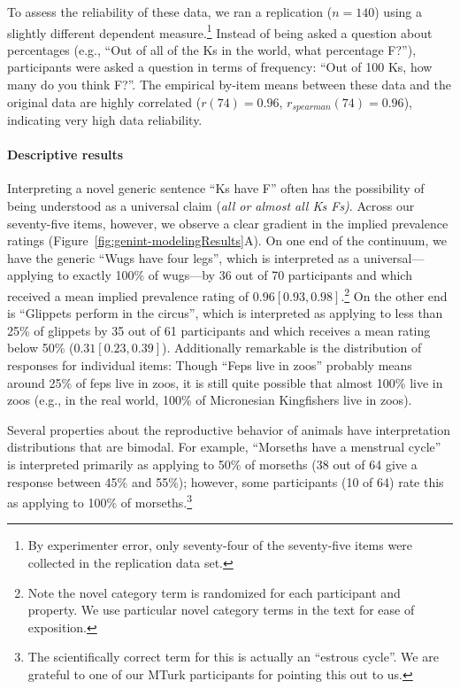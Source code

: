 \documentclass[floatsintext,doc]{apa6}
\theoremstyle{definition}
\theoremstyle{definition}
\theoremstyle{definition}
\theoremstyle{remark}
\begin{document}
To assess the reliability of these data, we ran a replication
(\(n=140\)) using a slightly different dependent measure.\footnote{By
  experimenter error, only seventy-four of the seventy-five items were
  collected in the replication data set.} Instead of being asked a
question about percentages (e.g., \enquote{Out of all of the Ks in the
world, what percentage F?}), participants were asked a question in terms
of frequency: \enquote{Out of 100 Ks, how many do you think F?}. The
empirical by-item means between these data and the original data are
highly correlated (\(r(74) = 0.96\), \(r_{spearman}(74)= 0.96\)),
indicating very high data reliability.

\paragraph{Descriptive results}\label{descriptive-results}

Interpreting a novel generic sentence \enquote{Ks have F} often has the
possibility of being understood as a universal claim (\emph{all or
almost all Ks Fs)}. Across our seventy-five items, however, we observe a
clear gradient in the implied prevalence ratings
(Figure~\ref{fig:genint-modelingResults}A). On one end of the continuum,
we have the generic \enquote{Wugs have four legs}, which is interpreted
as a universal---applying to exactly 100\% of wugs---by 36 out of 70
participants and which received a mean implied prevalence rating of
\(0.96 [0.93, 0.98]\).\footnote{Note the novel category term is
  randomized for each participant and property. We use particular novel
  category terms in the text for ease of exposition.} On the other end
is \enquote{Glippets perform in the circus}, which is interpreted as
applying to less than 25\% of glippets by 35 out of 61 participants and
which receives a mean rating below 50\% (\(0.31 [0.23, 0.39]\)).
Additionally remarkable is the distribution of responses for individual
items: Though \enquote{Feps live in zoos} probably means around 25\% of
feps live in zoos, it is still quite possible that almost 100\% live in
zoos (e.g., in the real world, 100\% of Micronesian Kingfishers live in
zoos).

Several properties about the reproductive behavior of animals have
interpretation distributions that are bimodal. For example,
\enquote{Morseths have a menstrual cycle} is interpreted primarily as
applying to 50\% of morseths (38 out of 64 give a response between 45\%
and 55\%); however, some participants (10 of 64) rate this as applying
to 100\% of morseths.\footnote{The scientifically correct term for this
  is actually an \enquote{estrous cycle}. We are grateful to one of our
  MTurk participants for pointing this out to us.} 
  
\end{document}
